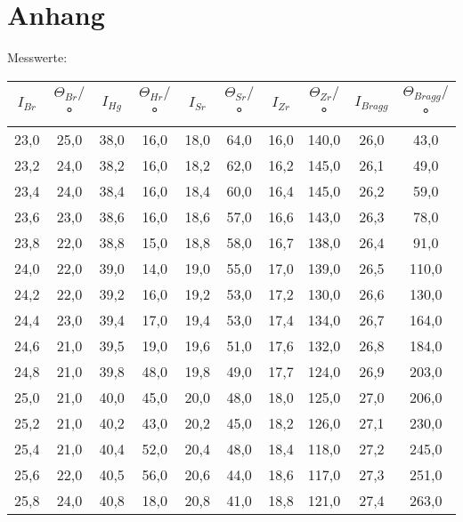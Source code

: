 \section{Anhang}
Messwerte:

\begin{table}[htp]
        \begin{center}
                \begin{tabular}{cc|cc|cc|cc|cc}
                \toprule
                $I_{Br}$ & $\Theta_{Br}/$° & $I_{Hg}$ & $\Theta_{Hr}/$° & $I_{Sr}$ & $\Theta_{Sr}/$° & $I_{Zr}$ & $\Theta_{Zr}/$° & $I_{Bragg}$ & $\Theta_{Bragg}/$° \\
                \midrule
                        23,0 & 25,0 & 38,0 & 16,0 & 18,0 & 64,0 & 16,0 & 140,0 & 26,0 & 43,0\\
                        23,2 & 24,0 & 38,2 & 16,0 & 18,2 & 62,0 & 16,2 & 145,0 & 26,1 & 49,0\\
                        23,4 & 24,0 & 38,4 & 16,0 & 18,4 & 60,0 & 16,4 & 145,0 & 26,2 & 59,0\\
                        23,6 & 23,0 & 38,6 & 16,0 & 18,6 & 57,0 & 16,6 & 143,0 & 26,3 & 78,0\\
                        23,8 & 22,0 & 38,8 & 15,0 & 18,8 & 58,0 & 16,7 & 138,0 & 26,4 & 91,0\\
                        24,0 & 22,0 & 39,0 & 14,0 & 19,0 & 55,0 & 17,0 & 139,0 & 26,5 & 110,0\\
                        24,2 & 22,0 & 39,2 & 16,0 & 19,2 & 53,0 & 17,2 & 130,0 & 26,6 & 130,0\\
                        24,4 & 23,0 & 39,4 & 17,0 & 19,4 & 53,0 & 17,4 & 134,0 & 26,7 & 164,0\\
                        24,6 & 21,0 & 39,5 & 19,0 & 19,6 & 51,0 & 17,6 & 132,0 & 26,8 & 184,0\\
                        24,8 & 21,0 & 39,8 & 48,0 & 19,8 & 49,0 & 17,7 & 124,0 & 26,9 & 203,0\\
                        25,0 & 21,0 & 40,0 & 45,0 & 20,0 & 48,0 & 18,0 & 125,0 & 27,0 & 206,0\\
                        25,2 & 21,0 & 40,2 & 43,0 & 20,2 & 45,0 & 18,2 & 126,0 & 27,1 & 230,0\\
                        25,4 & 21,0 & 40,4 & 52,0 & 20,4 & 48,0 & 18,4 & 118,0 & 27,2 & 245,0\\
                        25,6 & 22,0 & 40,5 & 56,0 & 20,6 & 44,0 & 18,6 & 117,0 & 27,3 & 251,0\\
                        25,8 & 24,0 & 40,8 & 18,0 & 20,8 & 41,0 & 18,8 & 121,0 & 27,4 & 263,0\\

\end{tabular}
\end{center}
\end{table}
